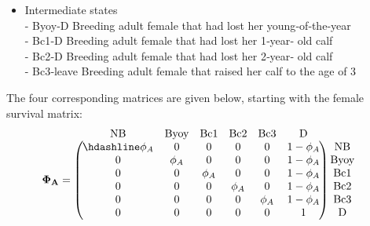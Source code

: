 \documentclass[
  12pt,
]{krantz}
\providecommand{\tightlist}{%
  \setlength{\itemsep}{0pt}\setlength{\parskip}{0pt}}
\begin{document}
\begin{itemize}
\tightlist
\item
  Intermediate states\\
  - Byoy‐D Breeding adult female that had lost her young‐of‐the‐year\\
  - Bc1‐D Breeding adult female that had lost her 1‐year‐ old calf\\
  - Bc2‐D Breeding adult female that had lost her 2‐year‐ old calf\\
  - Bc3‐leave Breeding adult female that raised her calf to the age of 3
\end{itemize}

The four corresponding matrices are given below, starting with the female survival matrix:
\[
\begin{matrix}
& \\
\mathbf{\Phi_A} =
\left ( \vphantom{ \begin{matrix} 12 \\ 12 \\ 12 \\ 12 \\ 12 \\ 12 \end{matrix} } \right .
\end{matrix}
\hspace{-1.2em}
\begin{matrix}
\text{NB} & \text{Byoy} & \text{Bc1} & \text{Bc2} & \text{Bc3} & \text{D} \\ \hdashline
\phi_A & 0      & 0      & 0      & 0      & 1 - \phi_A \\
0      & \phi_A & 0      & 0      & 0      & 1 - \phi_A \\
0      & 0      & \phi_A & 0      & 0      & 1 - \phi_A \\
0      & 0      & 0      & \phi_A & 0      & 1 - \phi_A \\
0      & 0      & 0      & 0      & \phi_A & 1 - \phi_A \\
0      & 0      & 0      & 0      & 0      & 1
\end{matrix}
\hspace{-0.2em}
\begin{matrix}
& \\
\left . \vphantom{ \begin{matrix} 12 \\ 12 \\ 12 \\ 12 \\ 12 \\ 12 \end{matrix} } \right )
\begin{matrix}
\text{NB} \\
\text{Byoy} \\
\text{Bc1} \\
\text{Bc2} \\
\text{Bc3} \\
\text{D}
\end{matrix}
\end{matrix}
\]
\end{document}
